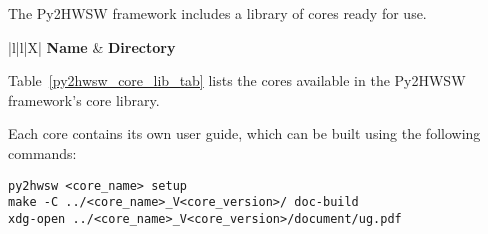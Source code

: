 %

The Py2HWSW framework includes a library of cores ready for use.

\begin{xltabular}{\textwidth}{|l|l|X|}
  \hline
  {\bf Name} & {\bf Directory}  \\ \hline \hline
  \endhead

  

  \caption{Table of cores available in the library of the Py2HWSW framework. The \textit{Directory} column is the path to the core's setup directory, relative to the Py2HWSW lib directory \texttt{py2hwsw/lib/}.}
  \label{py2hwsw_core_lib_tab}
\end{xltabular}

Table~\ref{py2hwsw_core_lib_tab} lists the cores available in the Py2HWSW framework's core library.

Each core contains its own user guide, which can be built using the following commands:

\begin{lstlisting}
py2hwsw <core_name> setup
make -C ../<core_name>_V<core_version>/ doc-build
xdg-open ../<core_name>_V<core_version>/document/ug.pdf
\end{lstlisting}
